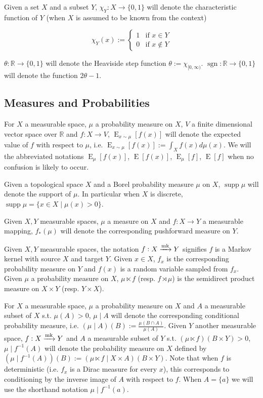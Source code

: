 \documentclass{article}
\numberwithin{equation}{section}
\theoremstyle{definition}
\theoremstyle{plain}
\newcommand{\Bool}{\{0,1\}}
\DeclareMathOperator{\Sgn}{sgn}
\DeclareMathOperator{\Supp}{supp}
\DeclareMathOperator{\E}{E}
\newcommand{\Reals}{\mathbb{R}}
\newcommand{\Markov}{\xrightarrow{\textnormal{mk}}}
\begin{document}
Given a set $X$ and a subset $Y$, $\chi_Y: X \rightarrow \Bool$ will denote the characteristic function of $Y$ (when $X$ is assumed to be known from the context)

$$\chi_Y(x):=\begin{cases}1 & \text{if } x \in Y \\ 0 & \text{if } x \not\in Y \end{cases}$$

$\theta: \Reals \rightarrow \Bool$ will denote the Heaviside step function $\theta:=\chi_{[0,\infty)}$. ${\Sgn: \Reals \rightarrow \Bool}$ will denote the function $2 \theta - 1$.
\subsection{Measures and Probabilities}

For $X$ a measurable space, $\mu$ a probability measure on $X$, $V$ a finite dimensional vector space over $\Reals$ and $f: X \rightarrow V$, $\E_{x \sim \mu}[f(x)]$ will denote the expected value of $f$ with respect to $\mu$, i.e. $\E_{x \sim \mu}[f(x)] := \int_X f(x) d\mu(x)$. We will the abbreviated notations $\E_\mu[f(x)]$, $\E[f(x)]$, $\E_\mu[f]$, $\E[f]$ when no confusion is likely to occur.

Given a topological space $X$ and a Borel probability measure $\mu$ on $X$, $\Supp \mu$ will denote the support of $\mu$. In particular when $X$ is discrete, ${\Supp \mu = \{x \in X \mid \mu(x) > 0\}}$.

Given $X,Y$ measurable spaces, $\mu$ a measure on $X$ and $f: X \rightarrow Y$ a measurable mapping, $f_*(\mu)$ will denote the corresponding pushforward measure on $Y$.

Given $X,Y$ measurable spaces, the notation $f: X \xrightarrow{\textnormal{mk}} Y$ signifies $f$ is a Markov kernel with source $X$ and target $Y$. Given $x \in X$, $f_x$ is the corresponding probability measure on $Y$ and $f(x)$ is a random variable sampled from $f_x$. Given $\mu$ a probability measure on $X$, $\mu \ltimes f$ (resp. $f \rtimes \mu$) is the semidirect product measure on $X \times Y$ (resp. $Y \times X$).

For $X$ a measurable space, $\mu$ a probability measure on $X$ and $A$ a measurable subset of $X$ s.t. $\mu(A) > 0$, $\mu \mid A$ will denote the corresponding conditional probability measure, i.e. $(\mu \mid A)(B):=\frac{\mu(B \cap A)}{\mu(A)}$. Given $Y$ another measurable space, $f: X \Markov Y$ and $A$ a measurable subset of $Y$ s.t. $(\mu \ltimes f)(B \times Y) > 0$, $\mu \mid f^{-1}(A)$ will denote the probability measure on $X$ defined by ${(\mu \mid f^{-1}(A))(B):=(\mu \ltimes f \mid X \times A)(B \times Y)}$. Note that when $f$ is deterministic (i.e. $f_x$ is a Dirac measure for every $x$), this corresponds to conditioning by the inverse image of $A$ with respect to $f$. When $A=\{a\}$ we will use the shorthand notation $\mu \mid f^{-1}(a)$.
\end{document}
